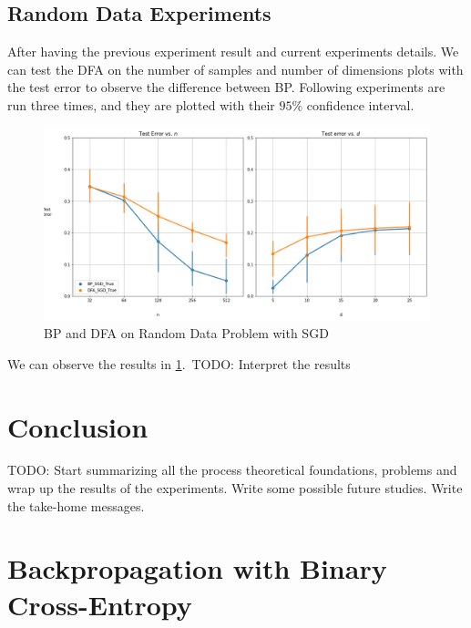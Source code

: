 \documentclass[a4paper, nobind]{templates/ociamthesis}
\begin{document}
\hypertarget{random-data-experiments}{%
\section{Random Data Experiments}\label{random-data-experiments}}

After having the previous experiment result and current experiments details. We can test the DFA on the number of samples and number of dimensions plots with the test error to observe the difference between BP. Following experiments are run three times, and they are plotted with their \(95\%\) confidence interval.

\begin{figure}

{\centering \includegraphics[width=1\linewidth]{figures/3_random_SGD_BP_DFA} 

}

\caption{BP and DFA on Random Data Problem with SGD}\label{fig:DFARandom}
\end{figure}

\noindent We can observe the results in \ref{fig:DFARandom}.~TODO: Interpret the results

\hypertarget{chap:conc}{%
\chapter*{Conclusion}\label{chap:conc}}

TODO: Start summarizing all the process theoretical foundations, problems and wrap up the results of the experiments. Write some possible future studies. Write the take-home messages.

\hypertarget{chap:appendix_a}{%
\chapter{Backpropagation with Binary Cross-Entropy}\label{chap:appendix_a}}
\end{document}
